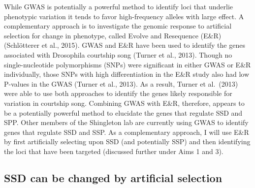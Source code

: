 \documentclass[
  11pt,
]{article}
\begin{document}
While GWAS is potentially a powerful method to identify loci that
underlie phenotypic variation it tends to favor high-frequency alleles
with large effect. A complementary approach is to investigate the
genomic response to artificial selection for change in phenotype, called
Evolve and Resequence (E\&R) (Schlötterer et al., 2015). GWAS and E\&R
have been used to identify the genes associated with Drosophila
courtship song (Turner et al., 2013). Though no single-nucleotide
polymorphisms (SNPs) were significant in either GWAS or E\&R
individually, those SNPs with high differentiation in the E\&R study
also had low P-values in the GWAS (Turner et al., 2013). As a result,
Turner et al.~(2013) were able to use both approaches to identify the
genes likely responsible for variation in courtship song. Combining GWAS
with E\&R, therefore, appears to be a potentially powerful method to
elucidate the genes that regulate SSD and SPP. Other members of the
Shingleton lab are currently using GWAS to identify genes that regulate
SSD and SSP. As a complementary approach, I will use E\&R by first
artificially selecting upon SSD (and potentially SSP) and then
identifying the loci that have been targeted (discussed further under
Aims 1 and 3).

\subsection{SSD can be changed by artificial selection}
\end{document}
